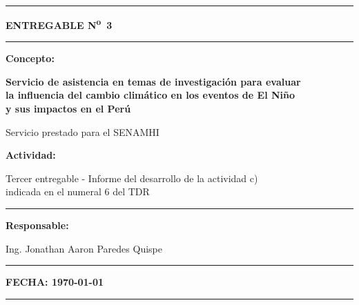 \documentclass[11pt,a4paper]{article}
\begin{document}

\begin{titlepage}
\centering
\noindent\rule{\textwidth}{0.6pt}

\vspace{1.2cm}
{\Large \bfseries ENTREGABLE N\textsuperscript{o}~3 \par}
\vspace{1.2cm}
\rule{0.7\textwidth}{0.6pt}

\vspace{1.2cm}
{\normalsize \bfseries Concepto: \par}
\vspace{0.3cm}
{\large \bfseries Servicio de asistencia en temas de investigación para evaluar\\
la influencia del cambio climático en los eventos de El Niño\\
y sus impactos en el Perú \par}

\vspace{1.4cm}
{\small Servicio prestado para el SENAMHI \par}

\vspace{1.4cm}
{\normalsize \bfseries Actividad: \par}
\vspace{0.2cm}
{\normalsize Tercer entregable - Informe del desarrollo de la actividad c)\\
indicada en el numeral 6 del TDR \par}

\vspace{1.2cm}
\rule{0.7\textwidth}{0.6pt}

\vspace{0.3cm}
{\small \bfseries Responsable: \par}
\vspace{0.2cm}
{\small Ing. Jonathan Aaron Paredes Quispe \par}
\vspace{0.3cm}
\rule{0.7\textwidth}{0.6pt}

\vfill
{\small \bfseries FECHA: \today \par}
\vspace{0.6cm}
\noindent\rule{\textwidth}{0.6pt}
\end{titlepage}

\begingroup
\setlength{\parskip}{0pt} %
\tableofcontents
\listoffigures
\listoftables
\endgroup
\clearpage
\end{document}
